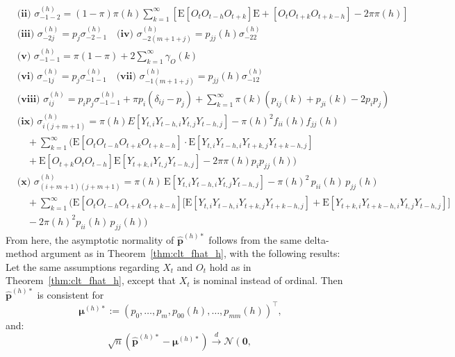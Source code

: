 ﻿\documentclass[12pt,a4paper]{scrreprt}
\theoremstyle{definition}
\begin{document}
\begin{appendices}
\begin{align*}
    &\textbf{(ii) }\sigma_{-1 -2}^{(h)} = (1-\pi)\pi(h)\sum_{k=1}^{\infty} [\mathrm{E}[O_t O_{t-h}O_{t+k}]\mathrm{E}+[O_t O_{t+k}O_{t+k-h}]-2\pi \pi(h)] \\
    &\textbf{(iii) }\sigma_{-2 j}^{(h)} = p_j \sigma_{-2 -1}^{(h) } \quad \textbf{(iv) }\sigma_{-2 (m+1+j)}^{(h)} = p_{jj}(h) \sigma_{-2 2}^{(h)} \quad \\
    &\textbf{(v) }\sigma_{-1 -1}^{(h)} = \pi(1-\pi) + 2 \sum_{k=1}^{\infty} \gamma_O(k) \\
    &\textbf{(vi) }\sigma_{-1 j}^{(h)} = p_j \sigma_{-1 -1}^{(h)} \quad \textbf{(vii) }\sigma_{-1 (m+1+j)}^{(h)} = p_{jj}(h) \sigma_{-1 2}^{(h)} \\
    &\textbf{(viii) }\sigma_{ij}^{(h)} = p_i p_j \sigma_{-1 -1}^{(h)} + \pi p_i(\delta_{ij} - p_j) + \sum_{k = 1}^{\infty}\pi(k)(p_{ij}(k)+ p_{ji}(k)- 2p_ip_j) \\   
    &\textbf{(ix) }\sigma_{i(j+m+1)}^{(h)} =\pi(h) E[Y_{t, i}Y_{t-h, i}Y_{t, j}Y_{t-h, j}]- \pi(h)^2f_{ii}(h)f_{jj}(h) \\
    & \quad + \sum_{k = 1}^{\infty} \bigl(\mathrm{E}[O_t O_{t-h} O_{t+k} O_{t+k-h}]\cdot \mathrm{E}[Y_{t,i}Y_{t-h,i}Y_{t+k,j}Y_{t+k-h,j}] \\
    &\quad + \mathrm{E}[O_{t+k}O_{t}O_{t-h}]\mathrm{E}[Y_{t+k, i}Y_{t, j}Y_{t-h, j}] - 2\pi\pi(h) p_i p_{jj}(h) \bigr) \\
    &\textbf{(x) } \sigma^{(h)}_{(i+m+1)(j+m+1)} = \pi(h)\,\mathrm{E}[Y_{t,i}Y_{t-h, i}Y_{t, j}Y_{t-h, j}] - 
    \pi(h)^2\, p_{ii}(h)\, p_{jj}(h) \\
    &\quad + \sum_{k=1}^{\infty} \bigl(\mathrm{E}[O_t O_{t-h} O_{t+k} O_{t+k-h}]\bigl[\mathrm{E}[Y_{t,i}Y_{t-h, i}Y_{t+k, j}Y_{t+k-h, j}] 
    + \mathrm{E}[Y_{t+k, i}Y_{t+k-h, i}Y_{t, j}Y_{t-h, j}]\bigr]\\
    & \quad - 2\pi(h)^2 p_{ii}(h)\,p_{jj}(h)\bigr)
\end{align*}
From here, the asymptotic normality of $\hat{\boldsymbol{p}}^{(h)*}$ follows from the same delta-method argument as in Theorem~\ref{thm:clt_fhat_h},
with the following results:\\ 
Let the same assumptions regarding $X_t$ and $O_t$ hold as in Theorem~\ref{thm:clt_fhat_h}, except that $X_t$ is nominal instead of ordinal.
Then $\hat{\boldsymbol{p}}^{(h)*}$ is consistent for 
\[\boldsymbol{\mu}^{(h)*} := (p_0, \ldots, p_m, p_{00}(h), \ldots, p_{mm}(h))^\top,\] 
and: 
\[
    \sqrt{n}\!\left(\hat{\boldsymbol{p}}^{(h)*} 
    - \boldsymbol{\mu}^{(h)*}\right)
    \xrightarrow{d} \mathcal{N}\!\left(\boldsymbol{0},\, 
\]
\end{appendices}
\end{document}
